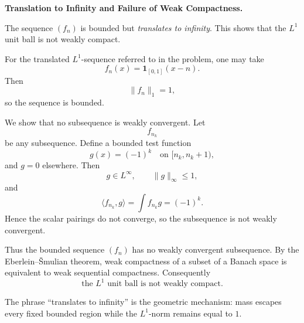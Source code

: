 \begin{problem}[CP-II-0330]
\label{prob:cp-ii-0330}
\textbf{Translation to Infinity and Failure of Weak Compactness.}

\hspace*{1.5em}The sequence $(f_n)$ is bounded but \emph{translates to infinity}.
		This shows that the $L^1$ unit ball is not weakly compact.
\end{problem}

\begin{solution}
For the translated \(L^1\)-sequence referred to in the problem, one may take
\[
f_n(x)
=
\mathbf1_{[0,1]}(x-n).
\]
Then
\[
\|f_n\|_1=1,
\]
so the sequence is bounded.

We show that no subsequence is weakly convergent. Let
\[
f_{n_k}
\]
be any subsequence. Define a bounded test function
\[
g(x)
=
(-1)^k
\quad\text{on }[n_k,n_k+1),
\]
and \(g=0\) elsewhere. Then
\[
g\in L^\infty,
\qquad
\|g\|_\infty\le1,
\]
and
\[
\langle f_{n_k},g\rangle
=
\int f_{n_k}g
=
(-1)^k.
\]
Hence the scalar pairings do not converge, so the subsequence is not weakly convergent.

Thus the bounded sequence \((f_n)\) has no weakly convergent subsequence. By the Eberlein--\v{S}mulian theorem, weak compactness of a subset of a Banach space is equivalent to weak sequential compactness. Consequently
\[
\boxed{
\text{the }L^1\text{ unit ball is not weakly compact}.
}
\]

The phrase ``translates to infinity'' is the geometric mechanism: mass escapes every fixed bounded region while the \(L^1\)-norm remains equal to \(1\).
\end{solution}


